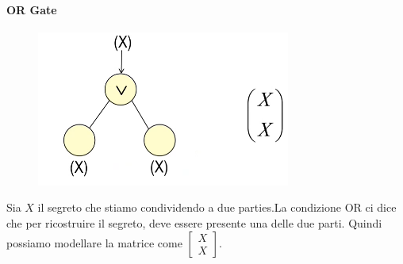 \documentclass{book}
\begin{document}
\paragraph{OR Gate}
\setlength\intextsep{0pt}
\begin{figure}
	\centering
    \includegraphics[scale=0.4]{2022-01-08-18-06-14.png}%
\end{figure}
Sia \(X\) il segreto che stiamo condividendo a due parties\@.La condizione OR ci dice che per ricostruire il segreto, deve essere presente una delle due parti\@.\newline
Quindi possiamo modellare la matrice come \(\begin{bmatrix}
    X\\X
\end{bmatrix}\).
\medskip
\end{document}
